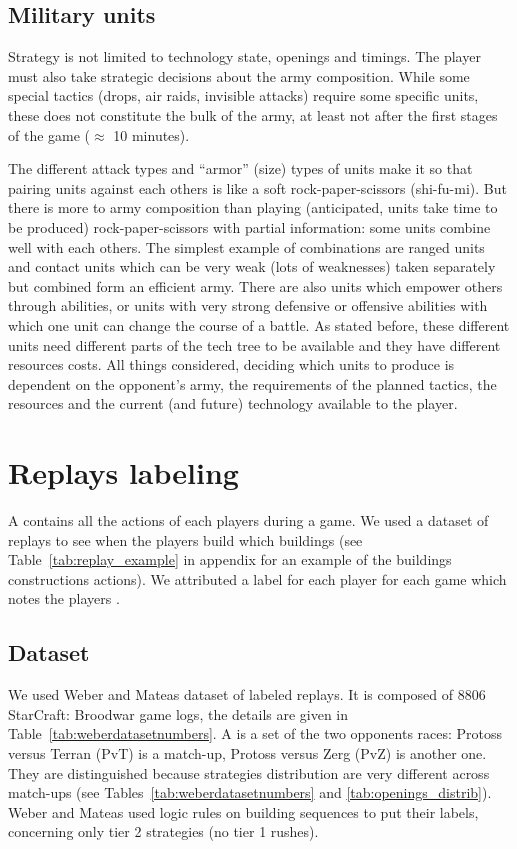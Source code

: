 \subsection{Military units}
\label{sec:militaryunits}
Strategy is not limited to technology state, openings and timings. The player must also take strategic decisions about the army composition. While some special tactics (drops, air raids, invisible attacks) require some specific units, these does not constitute the bulk of the army, at least not after the first stages of the game ($\approx$ 10 minutes).

The different attack types and ``armor'' (size) types of units make it so that pairing units against each others is like a soft rock-paper-scissors (shi-fu-mi). But there is more to army composition than playing (anticipated, units take time to be produced) rock-paper-scissors with partial information: some units combine well with each others. The simplest example of combinations are ranged units and contact units which can be very weak (lots of weaknesses) taken separately but combined form an efficient army. There are also units which empower others through abilities, or units with very strong defensive or offensive abilities with which one unit can change the course of a battle. As stated before, these different units need different parts of the tech tree to be available and they have different resources costs. All things considered, deciding which units to produce is dependent on the opponent's army, the requirements of the planned tactics, the resources and the current (and future) technology available to the player.

\section{Replays labeling}

A  contains all the actions of each players during a game. We used a dataset of replays to see when the players build which buildings (see Table~\ref{tab:replay_example} in appendix for an example of the buildings constructions actions). We attributed a label for each player for each game which notes the players .

\subsection{Dataset}

We used Weber and Mateas \citep{weberStrat} dataset of labeled replays. It is composed of 8806 StarCraft: Broodwar game logs, the details are given in Table~\ref{tab:weberdatasetnumbers}. A  is a set of the two opponents races: Protoss versus Terran (PvT) is a match-up, Protoss versus Zerg (PvZ) is another one. They are distinguished because strategies distribution are very different across match-ups (see Tables~\ref{tab:weberdatasetnumbers} and \ref{tab:openings_distrib}). Weber and Mateas used logic rules on building sequences to put their labels, concerning only tier 2 strategies (no tier 1 rushes).

